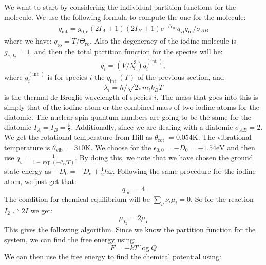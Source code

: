 \documentclass[12pt]{article}
\begin{document}
\begin{enumerate}
\subsection{}
We want to start by considering the individual partition functions for the molecule. We use the following formula to compute the one for the molecule:
\begin{equation}
\begin{aligned}
q_{\mathrm{int}}=g_{0, e}\left(2 I_A+1\right)\left(2 I_B+1\right) e^{-\beta \epsilon_{00}} q_{\mathrm{vi}} q_{\mathrm{ro}} / \sigma_{A B}
\end{aligned}
\end{equation}
where we have:
$q_{\mathrm{ro}}=T / \Theta_{\mathrm{ro}}$. Also the degeneracy of the iodine molecule is $g_{e, I_{2}}=1$. 
and then the total partition function for the species will be:
$$
q_i=\left(V / \lambda_i^3\right) q_i^{(\text {int })},
$$
where $q_i^{(\text {int })}$ is for species $i$ the $q_{\text {int }}(T)$ of the previous section, and
$$
\lambda_i=h / \sqrt{2 \pi m_i k_B T}
$$
is the thermal de Broglie wavelength of species $i$.
The mass that goes into this is simply that of the iodine atom or the combined mass of two iodine atoms for the diatomic.
The nuclear spin quantum numbers are going to be the same for the diatomic $I_A=I_B=\frac{5}{2}$. Additionally, since we are dealing with a diatomic $\sigma _{A B}=2$. We get the rotational temperature from Hill as $\theta_{\text {rot }}=0.054 \mathrm{K}$. The vibrational temperature is $\theta_{\text {vib }}=310 \mathrm{K}$. We choose for the $\epsilon_{0,0}=-D_0=-1.54 \text{eV}$ and then use $q_v=\frac{1}{1-\exp \left(-\theta_v / T\right)}$. By doing this, we note that we have chosen the ground state energy as $-D_0=-D_e+\frac{1}{2}\hbar\omega $. Following the same procedure for the iodine atom, we just get that:
\begin{equation}
  q_{\text{int}}= 4
\end{equation}
The condition for chemical equilibrium will be $\sum_{\nu} \nu_{i} \mu_{i}=0$. So for the reaction $I_{2} \rightleftharpoons 2 I$ we get:
\begin{equation}
  \mu_{I_2} = 2\mu_{I}
\end{equation}
This gives the following algorithm. Since we know the partition function for the system, we can find the free energy using:
\begin{equation}
  F = -kT \log Q
\end{equation}
We can then use the free energy to find the chemical potential using:

\end{enumerate}
\end{document}
